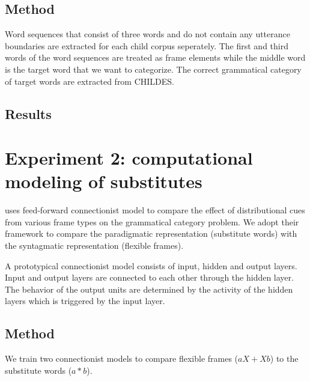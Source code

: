 \subsection{Method}
Word sequences that consist of three words and do not contain any
utterance boundaries are extracted for each child corpus seperately.
The first and third words of the word sequences are treated as frame
elements while the middle word is the target word that we want to
categorize.  The correct grammatical category of target words are
extracted from CHILDES.


\subsection{Results}

\section{Experiment 2: computational modeling of substitutes}

\cite{clair2010} uses feed-forward connectionist model to compare the
effect of distributional cues from various frame types on the
grammatical category problem.  We adopt their framework to compare the
paradigmatic representation (substitute words) with the syntagmatic
representation (flexible frames).

A prototypical connectionist model consists of input, hidden and
output layers.  Input and output layers are connected to each other
through the hidden layer.  The behavior of the output units are
determined by the activity of the hidden layers which is triggered by
the input layer.

\subsection{Method}

We train two connectionist models to compare flexible frames ($aX+Xb$)
to the substitute words ($a*b$).

